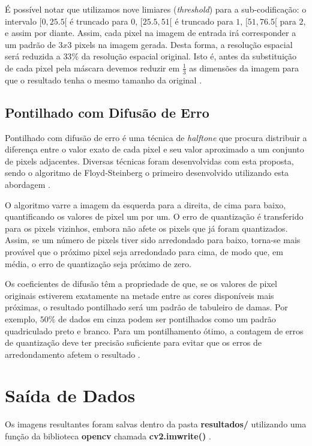 \documentclass[twoside,twocolumn]{article}
\begin{document}
É possível notar que utilizamos nove limiares (\textit{threshold}) para a sub-codificação: o intervalo $[0,25.5[$ é truncado para $0$, $[25.5,51[$ é truncado para $1$, $[51,76.5[$ para $2$, e assim por diante. Assim, cada pixel na imagem de entrada irá corresponder a um padrão de $3x3$ pixels na imagem gerada. Desta forma, a resolução espacial será reduzida a $33\%$ da resolução espacial original. Isto é, antes da substituição de cada pixel pela máscara devemos reduzir em $\frac{1}{3}$ as dimensões da imagem para que o resultado tenha o mesmo tamanho da original \cite{b4}.

\subsection{Pontilhado com Difusão de Erro}

Pontilhado com difusão de erro é uma técnica de \textit{halftone} que procura distribuir a diferença entre o valor exato de cada pixel e seu valor aproximado a um conjunto de pixels adjacentes. Diversas técnicas foram desenvolvidas com esta proposta, sendo o algoritmo de Floyd-Steinberg o primeiro desenvolvido utilizando esta abordagem \cite{b5}.

O algoritmo varre a imagem da esquerda para a direita, de cima para baixo, quantificando os valores de pixel um por um. O erro de quantização é transferido para os pixels vizinhos, embora não afete os pixels que já foram quantizados. Assim, se um número de pixels tiver sido arredondado para baixo, torna-se mais provável que o próximo pixel seja arredondado para cima, de modo que, em média, o erro de quantização seja próximo de zero.

Os coeficientes de difusão têm a propriedade de que, se os valores de pixel originais estiverem exatamente na metade entre as cores disponíveis mais próximas, o resultado pontilhado será um padrão de tabuleiro de damas. Por exemplo, $50\%$ de dados em cinza podem ser pontilhados como um padrão quadriculado preto e branco. Para um pontilhamento ótimo, a contagem de erros de quantização deve ter precisão suficiente para evitar que os erros de arredondamento afetem o resultado \cite{b6}.


\section{Saída de Dados}

Os imagens resultantes foram salvas dentro da pasta \textbf{resultados/} utilizando uma função da biblioteca \textbf{opencv} chamada \textbf{cv2.imwrite()} \cite{b1}.
\end{document}
